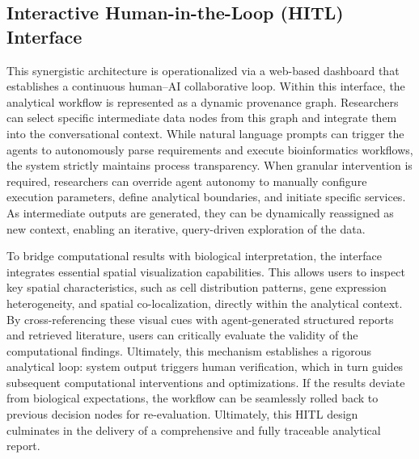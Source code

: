 \documentclass[11pt,a4paper]{article}
\begin{document}
\subsection{Interactive Human-in-the-Loop (HITL) Interface}

This synergistic architecture is operationalized via a web-based dashboard that establishes a continuous human--AI collaborative loop. Within this interface, the analytical workflow is represented as a dynamic provenance graph. Researchers can select specific intermediate data nodes from this graph and integrate them into the conversational context. While natural language prompts can trigger the agents to autonomously parse requirements and execute bioinformatics workflows, the system strictly maintains process transparency. When granular intervention is required, researchers can override agent autonomy to manually configure execution parameters, define analytical boundaries, and initiate specific services. As intermediate outputs are generated, they can be dynamically reassigned as new context, enabling an iterative, query-driven exploration of the data. 

To bridge computational results with biological interpretation, the interface integrates essential spatial visualization capabilities. This allows users to inspect key spatial characteristics, such as cell distribution patterns, gene expression heterogeneity, and spatial co-localization, directly within the analytical context. By cross-referencing these visual cues with agent-generated structured reports and retrieved literature, users can critically evaluate the validity of the computational findings. Ultimately, this mechanism establishes a rigorous analytical loop: system output triggers human verification, which in turn guides subsequent computational interventions and optimizations. If the results deviate from biological expectations, the workflow can be seamlessly rolled back to previous decision nodes for re-evaluation. Ultimately, this HITL design culminates in the delivery of a comprehensive and fully traceable analytical report.
\end{document}
